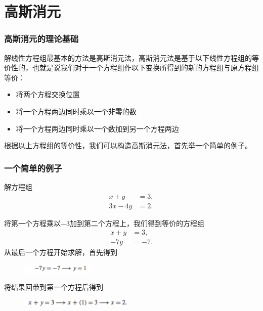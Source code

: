 \documentclass[10pt]{beamer}
\begin{document}


\section{高斯消元}

\begin{frame}
\frametitle{高斯消元的理论基础}
解线性方程组最基本的方法是高斯消元法，高斯消元法是基于以下线性方程组的等价性的，也就是说我们对于一个方程组作以下变换所得到的新的方程组与原方程组等价：
\begin{itemize}
\item 将两个方程交换位置
\item 将一个方程两边同时乘以一个非零的数
\item 将一个方程两边同时乘以一个数加到另一个方程两边
\end{itemize}

根据以上方程组的等价性，我们可以构造高斯消元法，首先举一个简单的例子。
\end{frame}


\begin{frame}
\frametitle{一个简单的例子}
\begin{example}
解方程组
\begin{align}
x + y &= 3, \nonumber \\
3x - 4y &= 2.
\end{align}
\end{example}
将第一个方程乘以$-3$加到第二个方程上，我们得到等价的方程组
\begin{align}
x + y &= 3, \nonumber \\
- 7y &= -7.
\end{align}
从最后一个方程开始求解，首先得到
\begin{figure}
\includegraphics[width=3.5cm]{figs/2_1_Gaussian_Elimi_Eq_1} 
\end{figure}
将结果回带到第一个方程后得到
\begin{figure}
\includegraphics[width=5.5cm]{figs/2_1_Gaussian_Elimi_Eq_2} 
\end{figure}
\end{frame}
\end{document}
